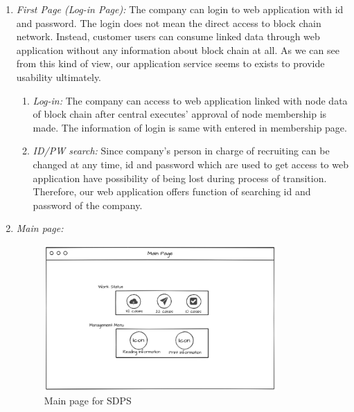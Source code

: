 \documentclass[conference]{IEEEtran}
\begin{document}
\begin{enumerate}
    \item \textit {First Page (Log-in Page): }The company can login to web application with id and password. The login does not mean the direct access to block chain network. Instead, customer users can consume linked data through web application without any information about block chain at all. As we can see from this kind of view, our application service seems to exists to provide usability ultimately.\\
    \begin{enumerate}
    	\item  \textit {Log-in:} The company can access to web application linked with node data of block chain after central executes’ approval of node membership is made. The information of login is same with entered in membership page. \\
        \item  \textit {ID/PW search:} Since company’s person in charge of recruiting can be changed at any time, id and password which are used to get access to web application have possibility of being lost during process of transition. Therefore, our web application offers function of searching id and password of the company.\\
    \end{enumerate}
    
    \item \textit {Main page:} 
    \begin{figure}[htbp]
	\centerline{\includegraphics[width=89mm,scale=0.5]{company/mainPage.png}}
	\caption{Main page for SDPS}
	\label{fig}
	\end{figure}
   

\end{enumerate}
\end{document}
